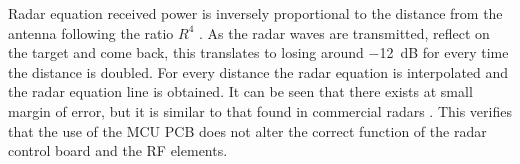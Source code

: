 Radar equation received power is inversely proportional to the distance from the antenna following the ratio $R^4$ \cite{Pozar2011}. As the radar waves are transmitted, reflect on the target and come back, this translates to losing around \SI{-12}{dB} for every time the distance is doubled. For every distance the radar equation is interpolated and the radar equation line is obtained. It can be seen that there exists at small margin of error, but it is similar to that found in commercial radars \cite{Richards2010,Pozar2011}. This verifies that the use of the MCU PCB does not alter the correct function of the radar control board and the RF elements.

%
%
%
%
%
%
